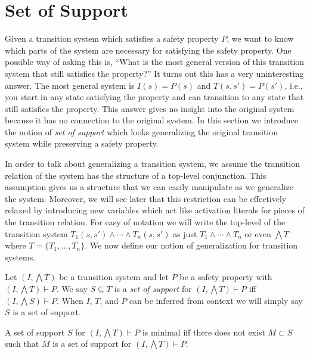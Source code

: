 \section{Set of Support}
\label{sec:support}

Given a transition system which satisfies a safety property $P$, we
want to know which parts of the system are necessary for satisfying
the safety property. One possible way of asking this is, ``What is the
most general version of this transition system that still satisfies
the property?'' It turns out this has a very uninteresting answer. The
most general system is $I(s) = P(s)$ and $T(s, s') = P(s')$, i.e., you
start in any state satisfying the property and can transition to any
state that still satisfies the property. This answer gives no insight
into the original system because it has no connection to the original
system. In this section we introduce the notion of {\em set of
  support} which looks generalizing the original transition system
while preserving a safety property.

In order to talk about generalizing a transition system, we assume the
transition relation of the system has the structure of a top-level
conjunction. This assumption gives us a structure that we can easily
manipulate as we generalize the system. Moreover, we will see later
that this restriction can be effectively relaxed by introducing new
variables which act like activation literals for pieces of the
transition relation. For easy of notation we will write the top-level
of the transition system $T_1(s, s') \land \cdots \land T_n(s, s')$ as
just $T_1 \land \cdots \land T_n$ or even $\bigwedge T$ where $T =
\{T_1, \ldots, T_n\}$. We now define our notion of generalization for
transition systems.


\begin{definition}
  \label{def:set-of-support}
  Let $(I, \bigwedge T)$ be a transition system and let $P$ be a
  safety property with $(I, \bigwedge T)\vdash P$. We say $S \subseteq
  T$ is a {\em set of support} for $(I, \bigwedge T)\vdash P$ iff $(I,
  \bigwedge S) \vdash P$. When $I$, $T$, and $P$ can be inferred from
  context we will simply say $S$ is a set of support.
\end{definition}

\begin{definition}
  \label{def:minimal-set-of-support}
  A set of support $S$ for $(I, \bigwedge T)\vdash P$ is minimal iff
  there does not exist $M \subset S$ such that $M$ is a set of support
  for $(I, \bigwedge T)\vdash P$.
\end{definition}


